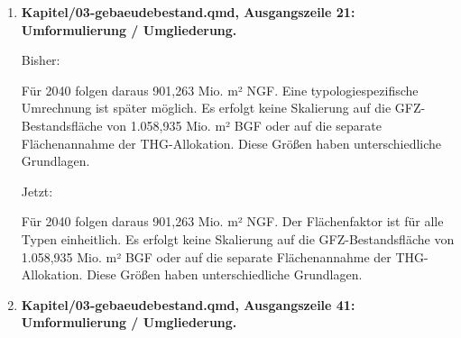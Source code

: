 \documentclass[
  ngerman,
  a4paper,
  DIV=11]{scrreprt}
\newenvironment{Shaded}{\begin{snugshade}}{\end{snugshade}}
\newcommand{\NormalTok}[1]{\textcolor[rgb]{0.00,0.23,0.31}{#1}}
\begin{document}
\begin{enumerate}
  Bisher:

\begin{Shaded}
\begin{Highlighting}[]
\NormalTok{Die nationale Flächensumme beträgt **1.126,579 Mio. m² BGF für 2040**, gegenüber **1.112,341 Mio. m² BGF** in der Quellspalte „heute“. Deren konkretes Bezugsjahr ist noch zu bestätigen. Sie wird deshalb nicht mit 2020 gleichgesetzt. Die Energiekennwerte beziehen sich laut Simulationsblatt auf **NGF**. Für diese erste Aggregation gilt die aus der bestehenden GFZ{-}Analyse übernommene einheitliche Modellannahme:}
\end{Highlighting}
\end{Shaded}

  Jetzt:

\begin{Shaded}
\begin{Highlighting}[]
\NormalTok{Die nationale Flächensumme beträgt **1.126,579 Mio. m² BGF für 2040**, gegenüber **1.112,341 Mio. m² BGF** in der Quellspalte „heute“. Deren konkretes Bezugsjahr ist nicht bestätigt. Sie wird deshalb nicht mit 2020 gleichgesetzt. Die Energiekennwerte beziehen sich laut Simulationsblatt auf **NGF**. Für die Aggregation gilt die aus der bestehenden GFZ{-}Analyse übernommene einheitliche Modellannahme:}
\end{Highlighting}
\end{Shaded}
\item
  \textbf{Kapitel/03-gebaeudebestand.qmd, Ausgangszeile 21:
  Umformulierung / Umgliederung.}

  Bisher:

\begin{Shaded}
\begin{Highlighting}[]
\NormalTok{Für 2040 folgen daraus 901,263 Mio. m² NGF. Eine typologiespezifische Umrechnung ist später möglich. Es erfolgt keine Skalierung auf die GFZ{-}Bestandsfläche von 1.058,935 Mio. m² BGF oder auf die separate Flächenannahme der THG{-}Allokation. Diese Größen haben unterschiedliche Grundlagen.}
\end{Highlighting}
\end{Shaded}

  Jetzt:

\begin{Shaded}
\begin{Highlighting}[]
\NormalTok{Für 2040 folgen daraus 901,263 Mio. m² NGF. Der Flächenfaktor ist für alle Typen einheitlich. Es erfolgt keine Skalierung auf die GFZ{-}Bestandsfläche von 1.058,935 Mio. m² BGF oder auf die separate Flächenannahme der THG{-}Allokation. Diese Größen haben unterschiedliche Grundlagen.}
\end{Highlighting}
\end{Shaded}
\item
  \textbf{Kapitel/03-gebaeudebestand.qmd, Ausgangszeile 41:
  Umformulierung / Umgliederung.}


\end{enumerate}
\end{document}
